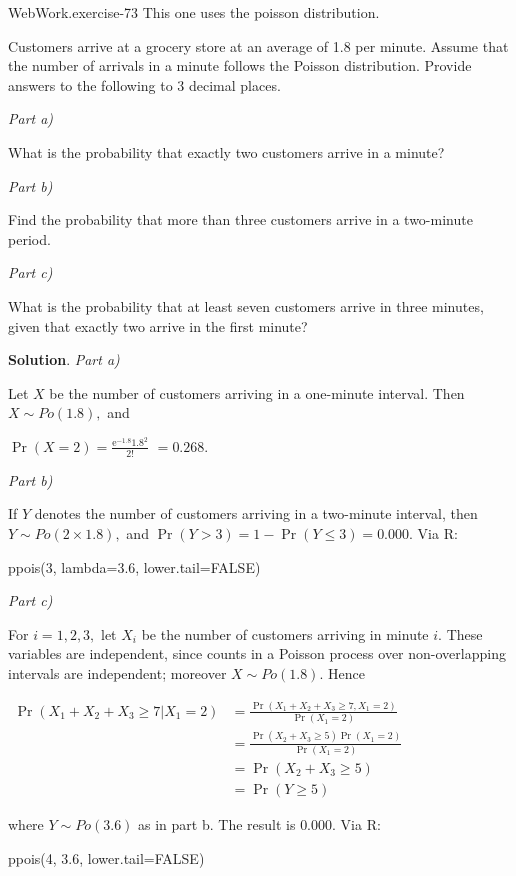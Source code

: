 \documentclass[10pt,]{book}
\numberwithin{equation}{section}
\newcommand{\amp}{&}
\begin{document}
%
\par
\hypertarget{p-1047}{}%
\begin{inlineexercise}{WebWork.}{exercise-73}%
\hypertarget{p-1048}{}%
This one uses the poisson distribution.%
\par\medskip
\hypertarget{p-1049}{}%
Customers arrive at a grocery store at an average of 1.8 per minute. Assume that the number of arrivals in a minute follows the Poisson distribution. Provide answers to the following to 3 decimal places.%
\par
\hypertarget{p-1050}{}%
\emph{Part a)}%
\par
\hypertarget{p-1051}{}%
What is the probability that exactly two customers arrive in a minute?%
\par
\hypertarget{p-1053}{}%
\emph{Part b)}%
\par
\hypertarget{p-1054}{}%
Find the probability that more than three customers arrive in a two-minute period.%
\par
\hypertarget{p-1056}{}%
\emph{Part c)}%
\par
\hypertarget{p-1057}{}%
What is the probability that at least seven customers arrive in three minutes, given that exactly two arrive in the first minute?%
\par\smallskip%
\noindent\textbf{Solution}.\hypertarget{solution-34}{}\quad%
\hypertarget{p-1059}{}%
\emph{Part a)}%
\par
\hypertarget{p-1060}{}%
Let \(X\) be the number of customers arriving in a one-minute interval. Then \(X \sim Po(1.8),\) and%
\par
\hypertarget{p-1061}{}%
\(\Pr(X = 2) = \frac{\text{e}^{-1.8} 1.8^2}{2!}\) \(= 0.268.\)%
\par
\hypertarget{p-1062}{}%
\emph{Part b)}%
\par
\hypertarget{p-1063}{}%
If \(Y\) denotes the number of customers arriving in a two-minute interval, then \(Y \sim Po(2 \times 1.8),\) and \(\Pr(Y > 3) = 1 - \Pr(Y \leq 3) = 0.000.\) Via R:%
\par
\hypertarget{p-1064}{}%
ppois(3, lambda=3.6, lower.tail=FALSE)%
\par
\hypertarget{p-1065}{}%
\emph{Part c)}%
\par
\hypertarget{p-1066}{}%
For \(i = 1, 2, 3,\) let \(X_i\) be the number of customers arriving in minute \(i\). These variables are independent, since counts in a Poisson process over non-overlapping intervals are independent; moreover \(X \sim Po(1.8).\) Hence%
\par
\hypertarget{p-1067}{}%
\(\begin{align*} \Pr(X_1 + X_2 + X_3 \geq 7 | X_1 = 2) \amp = \frac{\Pr(X_1 + X_2 + X_3 \geq 7, X_1 = 2)}{\Pr(X_1 = 2)} \\ \amp = \frac{\Pr(X_2 + X_3 \geq 5) \Pr(X_1 = 2)}{\Pr(X_1 = 2)} \\ \amp = \Pr(X_2 + X_3 \geq 5) \\ \amp = \Pr(Y \geq 5) \end{align*}\)%
\par
\hypertarget{p-1068}{}%
where \(Y \sim Po(3.6)\) as in part b. The result is \(0.000.\) Via R:%
\par
\hypertarget{p-1069}{}%
ppois(4, 3.6, lower.tail=FALSE)%
\end{inlineexercise}
\end{document}
